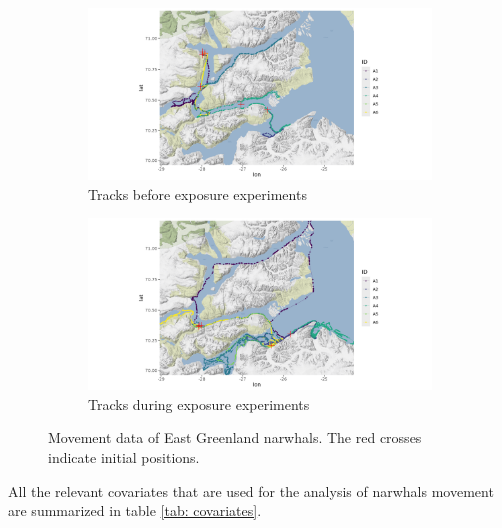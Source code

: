 \documentclass[11pt]{article}
\newcommand {\1}{\mathbb{1}}
\theoremstyle{definition}
\theoremstyle{remark}
\theoremstyle{remark}
\begin{document}
\begin{figure}[H]
	\centering
	\begin{subfigure}{0.49\textwidth}
		\centering
		\includegraphics[scale=0.38]{images/data_exploration/tracksBE2.png}
		\caption{Tracks before exposure experiments}
	\end{subfigure}
	\begin{subfigure}{0.49\textwidth}
		\centering
		\includegraphics[scale=0.38]{images/data_exploration/tracksAE.png}
		\caption{Tracks during exposure experiments}
	\end{subfigure}
	\caption{Movement data of East Greenland narwhals. The red crosses indicate initial positions.}
	\label{fig: tracks before and after exposure}
\end{figure}

 All the relevant covariates that are used for the analysis of narwhals movement are summarized in table \ref{tab: covariates}.
\end{document}

